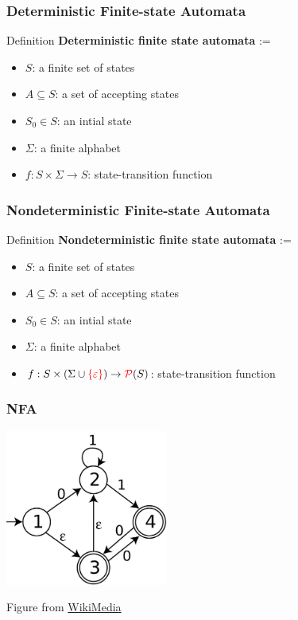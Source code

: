 \documentclass[languages_and_machines.tex]{subfiles}
\begin{document}
\begin{frame}
  \frametitle{Deterministic Finite-state Automata}

  \begin{block}{Definition}
    \textbf{Deterministic finite state automata} := \begin{itemize}
    \item \(S\): a finite set of states
    \item \(A \subseteq S\): a set of accepting states
    \item \(S_0 \in S\): an intial state
    \item \(\Sigma\): a finite alphabet
    \item \(f : S \times \Sigma \to S\): state-transition function
    \end{itemize}
  \end{block}
\end{frame}

\begin{frame}
  \frametitle{Nondeterministic Finite-state Automata}

  \begin{block}{Definition}
    \textbf{Nondeterministic finite state automata} := \begin{itemize}
    \item \(S\): a finite set of states
    \item \(A \subseteq S\): a set of accepting states
    \item \(S_0 \in S\): an intial state
    \item \(\Sigma\): a finite alphabet
    \item \(f : S \times (\Sigma \cup \textcolor{red}{\{\varepsilon\}}) \to \textcolor{red}{\mathcal P}(S)\): state-transition function
    \end{itemize}
  \end{block}

\end{frame}

\begin{frame}
  \frametitle{NFA}

  \includegraphics[width=0.4\textwidth]{nfa-powerset.png}

  {\tiny
    Figure from \href{https://commons.wikimedia.org/wiki/File:NFA-powerset-construction-example.svg}{WikiMedia}
  }
\end{frame}
\end{document}
